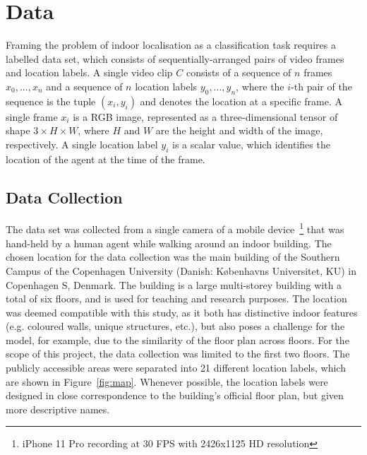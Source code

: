 \documentclass[a4paper]{article}
\begin{document}


  \section{Data} %
  \label{sec:data}

  Framing the problem of indoor localisation as a classification task requires a
  labelled data set, which consists of sequentially-arranged pairs of video
  frames and location labels. A single video clip $C$ consists of a sequence of
  $n$ frames $x_0, ..., x_n$ and a sequence of $n$ location labels $y_0, ...,
  y_n$, where the $i$-th pair of the sequence is the tuple $(x_i,y_i)$ and
  denotes the location at a specific frame. A single frame $x_i$ is a RGB image,
  represented as a three-dimensional tensor of shape $3 \times H \times W$,
  where $H$ and $W$ are the height and width of the image, respectively. A
  single location label $y_i$ is a scalar value, which identifies the location
  of the agent at the time of the frame. 

  \subsection{Data Collection} %
  \label{sub:data-collection}

  The data set was collected from a single camera of a mobile
  device~\footnote{iPhone 11 Pro recording at 30 FPS with 2426x1125 HD
  resolution} that was hand-held by a human agent while walking around an indoor
  building. The chosen location for the data collection was the main building of
  the Southern Campus of the Copenhagen University (Danish: K\o{}benhavns
  Universitet, KU) in Copenhagen S, Denmark. The building is a large
  multi-storey building with a total of six floors, and is used for teaching and
  research purposes. The location was deemed compatible with this study, as it
  both has distinctive indoor features (e.g. coloured walls, unique structures,
  etc.), but also poses a challenge for the model, for example, due to the
  similarity of the floor plan across floors. For the scope of this project, the
  data collection was limited to the first two floors. The publicly accessible
  areas were separated into 21 different location labels, which are shown in Figure~\ref{fig:map}.
  Whenever possible, the location labels were designed in close correspondence
  to the building's official floor plan, but given more descriptive names.
\end{document}
